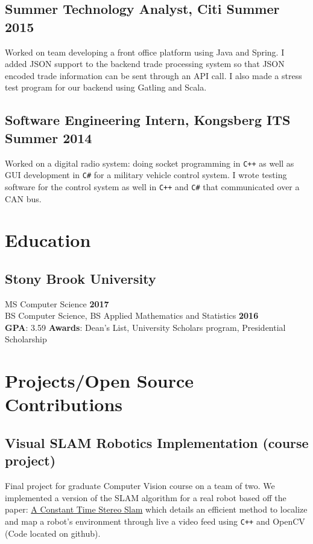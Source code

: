 \documentclass[5pt]{resume}
\begin{document}
\subsection{\textbf{Summer Technology Analyst, Citi \hfill Summer 2015}} 
{\color{default} Worked on team developing a front office
  platform using Java and Spring. I added JSON support to the backend trade
  processing system so that JSON encoded trade information can be sent through
  an API call. I also made a stress test program for our backend using Gatling
  and Scala.}

\subsection{\textbf{Software Engineering Intern, Kongsberg ITS \hfill Summer 2014}}
{\color{default} Worked on a digital radio system: doing socket programming in
  \verb!C++! as well as GUI development in \verb!C#! for a military vehicle control system. I
  wrote testing software for the control system as well in \verb!C++! and \verb!C#! that
  communicated over a CAN bus.  }


{\color{titleColor}\section{Education}}
\subsection{\textbf{Stony Brook University }}
{\color{default}MS Computer Science} \hfill \textbf{2017}\\
{\color{default}BS Computer Science, BS Applied Mathematics and Statistics} \hfill \textbf{2016} \\ 
\textbf{GPA}: {\color{default} 3.59} 
\textbf{Awards}: {\color{default}Dean’s List, University Scholars program, Presidential Scholarship}


{\color{titleColor}\section{Projects/Open Source Contributions}}
\subsection{\textbf{Visual SLAM Robotics Implementation (course project)}}
{\color{default} Final project for graduate Computer Vision course on a team of two. We
implemented a version of the SLAM algorithm for a real robot based off the
paper: \href{
  ''http://www.robots.ox.ac.uk/~cmei/articles/AConstantTimeEfficientStereoSLAMSystem_rss_09.pdf''}{A
  Constant Time Stereo Slam} which details an efficient method to localize and
map a robot's environment through live a video feed using \verb!C++! and OpenCV (Code
located on github).}
\end{document}
